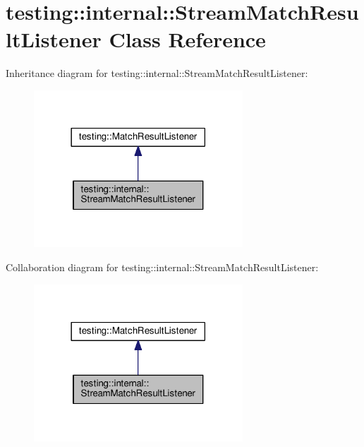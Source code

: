 \hypertarget{classtesting_1_1internal_1_1StreamMatchResultListener}{}\section{testing\+:\+:internal\+:\+:Stream\+Match\+Result\+Listener Class Reference}
\label{classtesting_1_1internal_1_1StreamMatchResultListener}


Inheritance diagram for testing\+:\+:internal\+:\+:Stream\+Match\+Result\+Listener\+:\nopagebreak
\begin{figure}[H]
\begin{center}
\leavevmode
\includegraphics[width=222pt]{classtesting_1_1internal_1_1StreamMatchResultListener__inherit__graph}
\end{center}
\end{figure}


Collaboration diagram for testing\+:\+:internal\+:\+:Stream\+Match\+Result\+Listener\+:\nopagebreak
\begin{figure}[H]
\begin{center}
\leavevmode
\includegraphics[width=222pt]{classtesting_1_1internal_1_1StreamMatchResultListener__coll__graph}
\end{center}
\end{figure}
